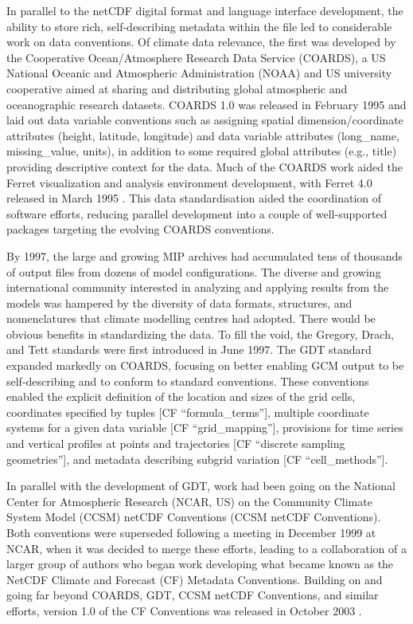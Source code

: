\documentclass[manuscript]{copernicus}
\newcommand{\mycomment}[1]{}
\begin{document}
In parallel to the netCDF digital format and language interface development, the ability to store rich, self-describing metadata within the file led to considerable work on data conventions. Of climate data relevance, the first was developed by the Cooperative Ocean/Atmosphere Research Data Service (COARDS), a US National Oceanic and Atmospheric Administration (NOAA) and US university cooperative aimed at sharing and distributing global atmospheric and oceanographic research datasets. COARDS 1.0 was released in February 1995 and laid out data variable conventions such as assigning spatial dimension/coordinate attributes (height, latitude, longitude) and data variable attributes (long\_name, missing\_value, units), in addition to some required global attributes (e.g., title) providing descriptive context for the data. Much of the COARDS work aided the Ferret visualization and analysis environment development, with Ferret 4.0 released in March 1995 \citep{noaa_pmel_version_1995}. This data standardisation aided the coordination of software efforts, reducing parallel development into a couple of well-supported packages targeting the evolving COARDS conventions.
\mycomment{
https://ferret.pmel.noaa.gov/Ferret/documentation/coards-netcdf-conventions
Also NCAR CSM - see http://cfconventions.org/conventions.html
}

By 1997, the large and growing MIP archives had accumulated tens of thousands of output files from dozens of model configurations. The diverse and growing international community interested in analyzing and applying results from the models was hampered by the diversity of data formats, structures, and nomenclatures that climate modelling centres had adopted. There would be obvious benefits in standardizing the data. To fill the void, the Gregory, Drach, and Tett \citep[GDT v1.4;][]{gregory_gdt_1999} standards were first introduced in June 1997. The GDT standard expanded markedly on COARDS, focusing on better enabling GCM output to be self-describing and to conform to standard conventions. These conventions enabled the explicit definition of the location and sizes of the grid cells, coordinates specified by tuples [CF ``formula\_terms''], multiple coordinate systems for a given data variable [CF ``grid\_mapping''], provisions for time series and vertical profiles at points and trajectories [CF ``discrete sampling geometries''], and metadata describing subgrid variation [CF ``cell\_methods''].

In parallel with the development of GDT, work had been going on the National Center for Atmospheric Research (NCAR, US) on the Community Climate System Model (CCSM) netCDF Conventions (CCSM netCDF Conventions). Both conventions were superseded following a meeting in December 1999 at NCAR, when it was decided to merge these efforts, leading to a collaboration of a larger group of authors who began work developing what became known as the NetCDF Climate and Forecast (CF) Metadata Conventions. Building on and going far beyond COARDS, GDT, CCSM netCDF Conventions, and similar efforts, version 1.0 of the CF Conventions was released in October 2003 \citep[e.g.,][]{eaton_netcdf_2024}.
\end{document}
